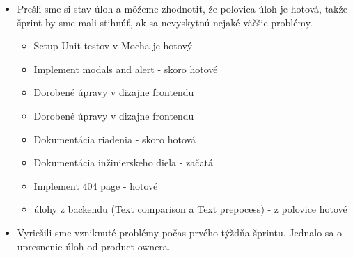 \documentclass{article}
\begin{document}
    \begin{itemize}
        \item Prešli sme si stav úloh a môžeme zhodnotiť, že polovica úloh je hotová, takže šprint by sme mali stihnúť, ak sa nevyskytnú nejaké väčšie problémy.
        \begin{itemize}
            \item Setup Unit testov v Mocha je hotový
            \item Implement modals and alert - skoro hotové
            \item Dorobené úpravy v dizajne frontendu 
            \item Dorobené úpravy v dizajne frontendu 
            \item Dokumentácia riadenia - skoro hotová
            \item Dokumentácia inžinierskeho diela - začatá
            \item Implement 404 page - hotové
            \item úlohy z backendu (Text comparison a Text prepocess) - z polovice hotové
        \end{itemize}
        \item Vyriešili sme vzniknuté problémy počas prvého týždňa šprintu. Jednalo sa o upresnenie úloh od product ownera. 
    \end{itemize}
\end{document}
